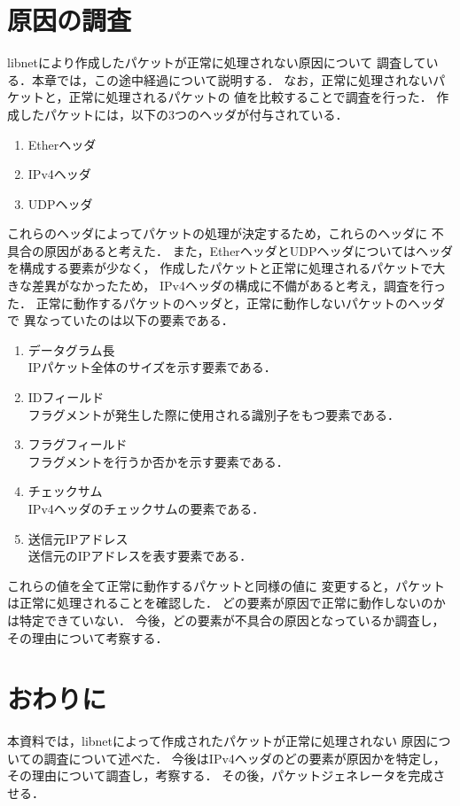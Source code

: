 \documentclass[12pt]{jsarticle}
\begin{document}
\section{原因の調査}
libnetにより作成したパケットが正常に処理されない原因について
調査している．本章では，この途中経過について説明する．
なお，正常に処理されないパケットと，正常に処理されるパケットの
値を比較することで調査を行った．
作成したパケットには，以下の3つのヘッダが付与されている．
\begin{enumerate}
    \item Etherヘッダ
    \item IPv4ヘッダ
    \item UDPヘッダ
\end{enumerate}
これらのヘッダによってパケットの処理が決定するため，これらのヘッダに
不具合の原因があると考えた．
また，EtherヘッダとUDPヘッダについてはヘッダを構成する要素が少なく，
作成したパケットと正常に処理されるパケットで大きな差異がなかったため，
IPv4ヘッダの構成に不備があると考え，調査を行った．
正常に動作するパケットのヘッダと，正常に動作しないパケットのヘッダで
異なっていたのは以下の要素である．
\begin{enumerate}
    \item データグラム長\\
        IPパケット全体のサイズを示す要素である．
    \item IDフィールド\\
        フラグメントが発生した際に使用される識別子をもつ要素である．
    \item フラグフィールド\\
        フラグメントを行うか否かを示す要素である．
    \item チェックサム\\
        IPv4ヘッダのチェックサムの要素である．
    \item 送信元IPアドレス\\
        送信元のIPアドレスを表す要素である．
\end{enumerate}
これらの値を全て正常に動作するパケットと同様の値に
変更すると，パケットは正常に処理されることを確認した．
どの要素が原因で正常に動作しないのかは特定できていない．
今後，どの要素が不具合の原因となっているか調査し，
その理由について考察する．

\section{おわりに}
本資料では，libnetによって作成されたパケットが正常に処理されない
原因についての調査について述べた．
今後はIPv4ヘッダのどの要素が原因かを特定し，
その理由について調査し，考察する．
その後，パケットジェネレータを完成させる．
\end{document}

